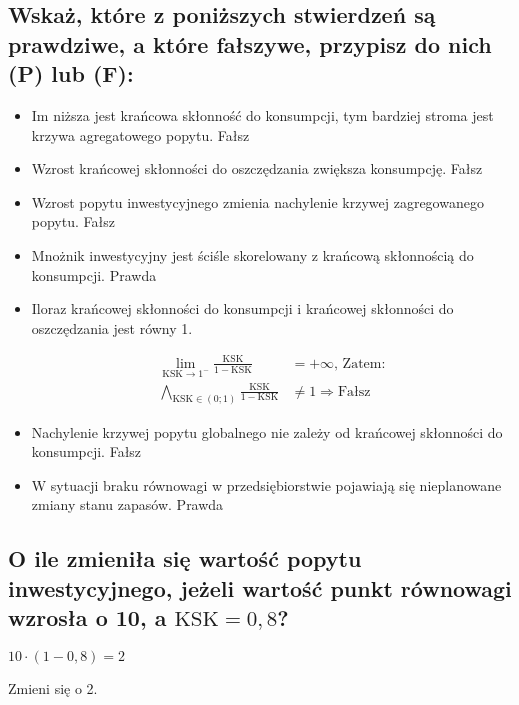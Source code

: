 \documentclass[a4paper,12pt]{article}
\begin{document}
\subsection{Wskaż, które z poniższych stwierdzeń są prawdziwe, a które fałszywe, przypisz do nich (P) lub (F):}

\begin{itemize}
	\item Im niższa jest krańcowa skłonność do konsumpcji, tym bardziej stroma jest krzywa agregatowego popytu. Fałsz
	\item Wzrost krańcowej skłonności do oszczędzania zwiększa konsumpcję. Fałsz
	\item Wzrost popytu inwestycyjnego zmienia nachylenie krzywej zagregowanego popytu. Fałsz
	\item Mnożnik inwestycyjny jest ściśle skorelowany z krańcową skłonnością do konsumpcji. Prawda

	\item Iloraz krańcowej skłonności do konsumpcji i krańcowej skłonności do oszczędzania jest równy 1.

	      \begin{align*}
		      \lim_{\text{KSK}\rightarrow 1^{-}} \frac{\text{KSK}}{1 - \text{KSK}}          & = +\infty \text{, Zatem:}         \\
		      \bigwedge_{\text{KSK} \in \left(0; 1\right)}\frac{\text{KSK}}{1 - \text{KSK}} & \not = 1 \Rightarrow \text{Fałsz}
	      \end{align*}

	\item Nachylenie krzywej popytu globalnego nie zależy od krańcowej skłonności do konsumpcji. Fałsz
	\item W sytuacji braku równowagi w przedsiębiorstwie pojawiają się nieplanowane zmiany stanu zapasów. Prawda
\end{itemize}

\subsection{O ile zmieniła się wartość popytu inwestycyjnego, jeżeli wartość punkt równowagi wzrosła o 10, a $\text{KSK} = 0,8$?}

$10 \cdot \left(1 - 0,8\right) = 2$

Zmieni się o 2.
\end{document}
